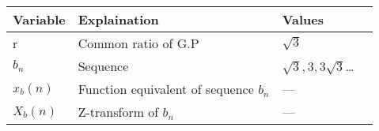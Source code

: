 \begin{table}[ht]
    \begin{tabular}{ | >{\centering\arraybackslash}m{2cm} | >{\centering\arraybackslash}m{3cm} | >{\centering\arraybackslash}m{2.3cm} | @{}m{0pt}@{} }
    \hline
    Variable & Explaination & Values &\\[10pt]
    \hline
    r & Common ratio of G.P & $\sqrt{3}$ &\\[10pt]
    \hline
    $b_n$ & Sequence & $\sqrt{3}, 3, 3\sqrt{3}$\dots &\\[10pt] 
    \hline
    $x_b(n)$ & Function equivalent of sequence $b_n$ & --- &\\[10pt]
    \hline 
    $X_b(n)$ & Z-transform of $b_n$ & --- &\\[10pt]
    \hline 
    \end{tabular}
    \begin{center}
    \end{center}
\end{table}
